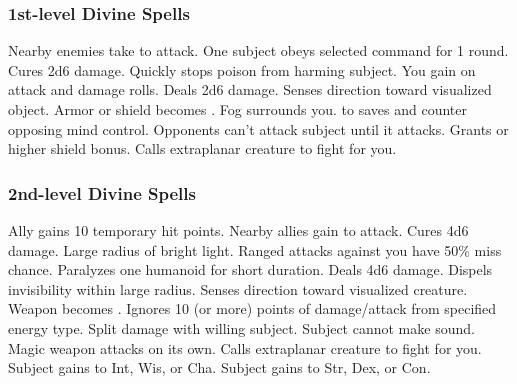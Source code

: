 \subsubsection{1st-level Divine Spells}
\begin{spelllist}
   Nearby enemies take  to attack.
   One subject obeys selected command for 1 round.
   Cures 2d6 damage.
   Quickly stops poison from harming subject.
   You gain  on attack and damage rolls.
   Deals 2d6 damage.
   Senses direction toward visualized object.
   Armor or shield becomes .
   Fog surrounds you.
    to saves and counter opposing mind control.
   Opponents can't attack subject until it attacks.
   Grants  or higher shield bonus.
   Calls extraplanar creature to fight for you.
\end{spelllist}

\subsubsection{2nd-level Divine Spells}
\begin{spelllist}
   Ally gains 10 temporary hit points.
   Nearby allies gain  to attack.
   Cures 4d6 damage.
   Large radius of bright light.
   Ranged attacks against you have 50\% miss chance.
   Paralyzes one humanoid for short duration.
   Deals 4d6 damage.
   Dispels invisibility within large radius.
   Senses direction toward visualized creature.
   Weapon becomes .
   Ignores 10 (or more) points of damage/attack from specified energy type.
    Split damage with willing subject.
   Subject cannot make sound.
   Magic weapon attacks on its own.
   Calls extraplanar creature to fight for you.
   Subject gains  to Int, Wis, or Cha.
   Subject gains  to Str, Dex, or Con.
\end{spelllist}

